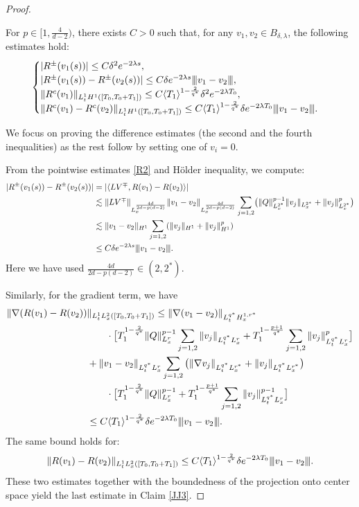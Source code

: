 \documentclass[10pt,a4paper]{amsart}
\newcommand{\vertiii}[1]{{\left\vert\kern-0.25ex\left\vert\kern-0.25ex\left\vert #1 
    \right\vert\kern-0.25ex\right\vert\kern-0.25ex\right\vert}}
\begin{document}
\begin{proof}
\begin{claim}\label{JJ3} For $p \in [1, \frac 4{d-2})$, there exists $C>0$ such that, for any $v_1, v_2 \in B_{\delta, \lambda}$, the following estimates hold:
\begin{align*}
\begin{cases}
|R^{\pm}(v_1(s))|\le C\delta^2 e^{-2\lambda s},\\
|R^{\pm}(v_1(s))-R^{\pm}(v_2(s))|\le C \delta e^{-2\lambda s}\vertiii{v_1-v_2},\\
\|R^c(v_1)\|_{L_t^1 H^1([T_0, T_0+T_1])}\le C\langle T_1\rangle^{1-\frac 2{q^*}}\delta^2 e^{-2\lambda T_0}, \\
\|R^c(v_1)-R^c(v_2)\|_{L_t^1 H^1([T_0, T_0+T_1])}\le C\langle T_1\rangle ^{1-\frac 2{q^*}}\delta e^{-2\lambda T_0}
\vertiii{v_1-v_2}. 
\end{cases}
\end{align*}
\end{claim}
We focus on proving the difference estimates (the second and the fourth inequalities) as the rest follow by setting one of $v_i=0$. 

From the pointwise estimates \eqref{R2} and H\"older inequality, we compute: 
\begin{align*}
|R^{\pm}(v_1(s))-R^{\pm}(v_2(s))|&=|\langle LV^{\mp}, R(v_1)-R(v_2)\rangle |\\
&\lesssim  \|LV^{\mp}\|_{L_x^{\frac{4d}{2d-p(d-2)}}}\|v_1-v_2\|_{L_x^{\frac{4d}{2d-p(d-2)}}} \sum_{j=1,2}\bigl(\|Q\|_{L_x^{2^*}}^{p-1}\|v_j\|_{L_x^{2^*}}+\|v_j\|_{L_x^{2^*}}^p\bigr)
\\
&\lesssim \|v_1-v_2\|_{H^1}\sum_{j=1,2}( \|v_j\|_{H^1}+\|v_j\|_{H^1}^p)\\
&\le C \delta e^{-2\lambda s}\vertiii{v_1-v_2}. 
\end{align*}
Here we have used $\frac{4d}{2d-p(d-2)} \in (2, 2^*)$.


Similarly, for the gradient term, we have
\begin{align}
\|\nabla(R(v_1)-R(v_2))&\|_{L_t^1 L_x^2([T_0,T_0+T_1])}\le \|\nabla(v_1-v_2)\|_{L_t^{q^*}H_x^{1, r^*}}\label{525}\\
&\qquad\cdot\bigl[
T_1^{1-\frac 2{q^*}}\|Q\|_{L_x^{r}}^{p-1}\sum_{j=1,2}\|v_j\|_{L_t^{q^*}L_x^r}
+T_1^{1-\frac {p+1}{q^*}}\sum_{j=1,2}\|v_j\|_{L_t^{q^*}L_x^r}^p\bigr]\notag\\
&+\|v_1-v_2\|_{L_t^{q^*}L_x^{r}}\sum_{j=1,2} \big( \|\nabla v_j\|_{L_t^{q^*}L_x^{r^*}} +  \|v_j\|_{L_t^{q^*}L_x^{r^*}}  \big) \notag\\
&\qquad\cdot\bigl[T_1^{1-\frac 2{q^*}}\|Q\|_{L_x^{r}}^{p-1}+T_1^{1-\frac {p+1}{q^*}}
\sum_{j=1,2}\|v_j\|_{L_t^{q^*}L_x^r}^{p-1}\bigr]\notag\\
&\le C\langle T_1\rangle^{1-\frac {2}{q^*}}\delta e^{-2\lambda T_0}\vertiii{v_1-v_2}. \notag
\end{align}
The same bound holds for: 
\[
\|R(v_1)-R(v_2)\|_{L_t^1L_x^2([T_0, T_0+T_1])}\le C\langle T_1\rangle^{1-\frac {2}{q^*}}\delta e^{-2\lambda T_0}\vertiii{v_1-v_2}.
\]
These two estimates together with the boundedness of the projection onto center space yield the last estimate in Claim \ref{JJ3}.


\end{proof}
\end{document}
